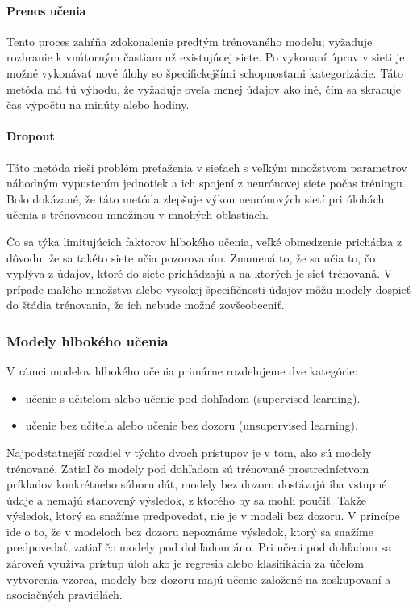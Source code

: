 \paragraph{Prenos učenia} Tento proces zahŕňa zdokonalenie predtým trénovaného modelu; vyžaduje rozhranie k vnútorným častiam už existujúcej siete. Po vykonaní úprav v sieti je možné vykonávať nové úlohy so špecifickejšími schopnosťami kategorizácie. Táto metóda má tú výhodu, že vyžaduje oveľa menej údajov ako iné, čím sa skracuje čas výpočtu na minúty alebo hodiny.
\paragraph{Dropout} Táto metóda rieši problém preťaženia v sieťach s veľkým množstvom parametrov náhodným vypustením jednotiek a ich spojení z neurónovej siete počas tréningu. Bolo dokázané, že táto metóda zlepšuje výkon neurónových sietí pri úlohách učenia s trénovacou množinou v mnohých oblastiach. 

Čo sa týka limitujúcich faktorov hlbokého učenia, veľké obmedzenie prichádza z dôvodu, že sa takéto siete učia pozorovaním. Znamená to, že sa učia to, čo vyplýva z údajov, ktoré do siete prichádzajú a na ktorých je sieť trénovaná. V prípade malého množstva alebo vysokej špecifičnosti údajov môžu modely dospieť do štádia trénovania, že ich nebude možné zovšeobecniť.


\subsubsection{Modely hlbokého učenia}
V rámci modelov hlbokého učenia primárne rozdelujeme dve kategórie:
\begin{itemize}
  \item učenie s učitelom alebo učenie pod dohľadom (supervised learning).
  \item učenie bez učitela alebo učenie bez dozoru (unsupervised learning).
\end{itemize}



Najpodstatnejší rozdiel v týchto dvoch prístupov je v tom, ako sú modely trénované. Zatiaľ čo modely pod dohľadom sú trénované prostredníctvom príkladov konkrétneho súboru dát, modely bez dozoru dostávajú iba vstupné údaje a nemajú stanovený výsledok, z ktorého by sa mohli poučiť. Takže výsledok, ktorý sa snažíme predpovedať, nie je v modeli bez dozoru. V princípe ide o to, že v modeloch bez dozoru nepoznáme výsledok, ktorý sa snažíme predpovedať, zatiaľ čo modely pod dohľadom áno. Pri učení pod dohľadom sa zároveň využíva prístup úloh ako je regresia alebo klasifikácia za účelom vytvorenia vzorca, modely bez dozoru majú učenie založené na zoskupovaní a asociačných pravidlách.

